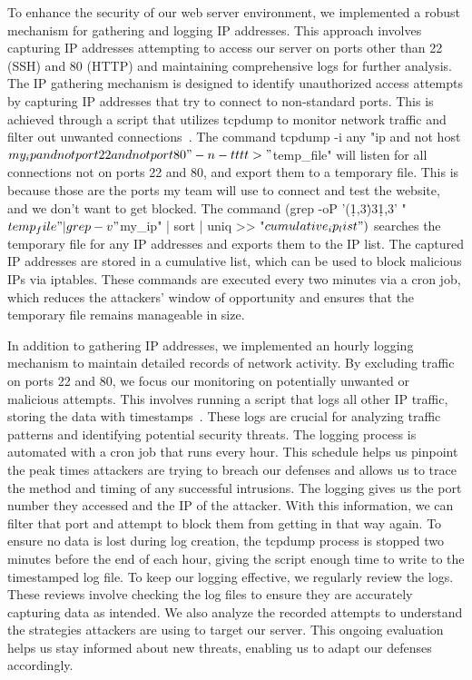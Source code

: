 To enhance the security of our web server environment, we implemented a robust mechanism for gathering and logging IP addresses. This approach involves capturing IP addresses attempting to access our server on ports other than 22 (SSH) and 80 (HTTP) and maintaining comprehensive logs for further analysis. 
The IP gathering mechanism is designed to identify unauthorized access attempts by capturing IP addresses that try to connect to non-standard ports. This is achieved through a script that utilizes tcpdump to monitor network traffic and filter out unwanted connections~\cite{TechTarget_Net}. The command
tcpdump -i any "ip and not host $my_ip and not port 22 and not port 80" -n -tttt > "$temp_file" will listen for all connections not on ports 22 and 80, and export them to a temporary file. This is because those are the ports my team will use to connect and test the website, and we don't want to get blocked. The command (grep -oP '(\d{1,3}\.){3}\d{1,3}' "$temp_file" | grep -v "$my_ip" | sort | uniq >> "$cumulative_ip_list")$ searches the temporary file for any IP addresses and exports them to the IP list. The captured IP addresses are stored in a cumulative list, which can be used to block malicious IPs via iptables. These commands are executed every two minutes via a cron job, which reduces the attackers' window of opportunity and ensures that the temporary file remains manageable in size.

  In addition to gathering IP addresses, we implemented an hourly logging mechanism to maintain detailed records of network activity. By excluding traffic on ports 22 and 80, we focus our monitoring on potentially unwanted or malicious attempts. This involves running a script that logs all other IP traffic, storing the data with timestamps~\cite{Schwartz_TCPDUMP}. These logs are crucial for analyzing traffic patterns and identifying potential security threats. The logging process is automated with a cron job that runs every hour. This schedule helps us pinpoint the peak times attackers are trying to breach our defenses and allows us to trace the method and timing of any successful intrusions. The logging gives us the port number they accessed and the IP of the attacker. With this information, we can filter that port and attempt to block them from getting in that way again. To ensure no data is lost during log creation, the tcpdump process is stopped two minutes before the end of each hour, giving the script enough time to write to the timestamped log file. To keep our logging effective, we regularly review the logs. These reviews involve checking the log files to ensure they are accurately capturing data as intended. We also analyze the recorded attempts to understand the strategies attackers are using to target our server. This ongoing evaluation helps us stay informed about new threats, enabling us to adapt our defenses accordingly.
